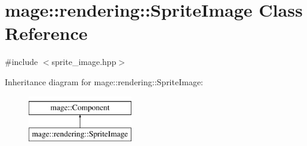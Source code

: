\hypertarget{classmage_1_1rendering_1_1_sprite_image}{}\section{mage\+:\+:rendering\+:\+:Sprite\+Image Class Reference}
\label{classmage_1_1rendering_1_1_sprite_image}


{\ttfamily \#include $<$sprite\+\_\+image.\+hpp$>$}

Inheritance diagram for mage\+:\+:rendering\+:\+:Sprite\+Image\+:\begin{figure}[H]
\begin{center}
\leavevmode
\includegraphics[height=2.000000cm]{classmage_1_1rendering_1_1_sprite_image}
\end{center}
\end{figure}
